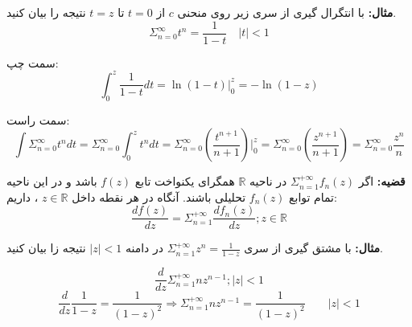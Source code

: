 \documentclass[12pt]{report}
\begin{document}
\textbf{مثال:}
	با انتگرال گیری از سری زیر روی منحنی 
	$c$
	از
	$t = 0$
	تا
	$t = z$
	نتیجه را بیان کنید.
	$$ \Sigma_{n = 0}^{\infty} t^n = \frac{1}{1 - t} \quad |t| < 1$$
	
	سمت چپ:
	$$\int_{0}^{z} \frac{1}{1 - t} dt=\ln (1 - t) |_{0}^{z} = - \ln (1 - z)$$
	\newline
	
	سمت راست:
	$$\int \Sigma_{n = 0}^{\infty} t^n dt = \Sigma_{n = 0}^{\infty} \int_{0}^{z} t^n dt = \Sigma_{n = 0}^{\infty} (\frac{t^{n + 1}}{n+1})|_{0}^{z} =\Sigma_{n = 0}^{\infty} (\frac{z^{n + 1}}{n+1}) = \Sigma_{n = 0}^{\infty} \frac{z^n}{n} $$
	\newline
	
	
	
	
	
	
	
	
	
	
	
	
	
	
	
	
	
	
	
	
	
	
	\textbf{قضیه:}
	اگر 
	$\Sigma_{n = 1}^{+\infty} f_n(z)$
	در ناحیه 
	$\mathbb{R}$
	همگرای یکنواخت تابع 
	$f(z)$
	باشد و در این ناحیه تمام توابع
	$f_n(z)$
	تحلیلی باشند. آنگاه در هر نقطه داخل
	$z \in \mathbb{R}$
	،
	داریم:
	$$\frac{df(z)}{dz} = \Sigma_{n = 1}^{+\infty}\frac{df_n(z)}{dz} ; z \in \mathbb{R}$$
	
	\textbf{مثال:}
	با مشتق گیری از سری 
	$\Sigma_{n = 1}^{+\infty} z^n = \frac{1}{1 - z}$
	در دامنه 
	$|z|<1$
	نتیجه زا بیان کنید.
	
	$$\frac{d}{dz} \Sigma_{n = 1}^{+\infty} n z^{n - 1} ; |z|< 1$$
	$$\frac{d}{dz} \frac{1}{1 - z} = \frac{1}{(1 - z)^2} \Rightarrow \Sigma_{n = 1}^{+\infty} n z^{n - 1} = \frac{1}{(1 - z)^2} \qquad |z|<1$$
	\newline
	
\end{document}
